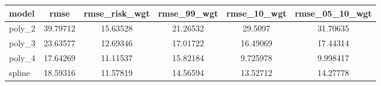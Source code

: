 \documentclass[]{article}
\begin{document}
\begin{tabular}{lccccc} \hline
model & rmse & rmse\_risk\_wgt & rmse\_99\_wgt & rmse\_10\_wgt & rmse\_05\_10\_wgt \\ \hline
poly\_2 & 39.79712 & 15.63528 & 21.26532 & 29.5097 & 31.70635 \\
poly\_3 & 23.63577 & 12.69346 & 17.01722 & 16.49069 & 17.44314 \\
poly\_4 & 17.64269 & 11.11537 & 15.82184 & 9.725978 & 9.998417 \\
 spline & 18.59316 & 11.57819 & 14.56594 & 13.52712 & 14.27778 \\ \hline
\end{tabular}
\end{document}
